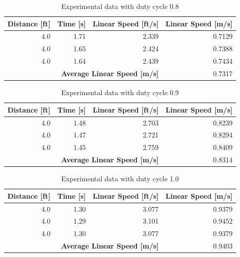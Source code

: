 \documentclass[fontsize=11pt, %
                             paper=letter, %
                             openany, %
                             captions=tableheading,
                             index=totoc,
                             hyperref]{labbook}
\begin{document}
\begin{addmargin}[0cm]{0cm}
\begin{table}[h!]
    \centering
    \begin{tabular}{r|r|r|r}
        \toprule
        \textbf{Distance [ft]} & \textbf{Time [s]} & \textbf{Linear Speed [ft/s]} & \textbf{Linear Speed [m/s]}\\
        \toprule
        4.0 & 1.71 & 2.339 & 0.7129\\
        4.0 & 1.65 & 2.424 & 0.7388\\
        4.0 & 1.64 & 2.439 & 0.7434\\
        \bottomrule
        \multicolumn{3}{r|}{\textbf{Average Linear Speed [m/s]}} & 0.7317\\
        \bottomrule
    \end{tabular}
    \caption{Experimental data with duty cycle 0.8}
    \label{tab:duty0.8}
\end{table}

\begin{table}[h!]
    \centering
    \begin{tabular}{r|r|r|r}
        \toprule
        \textbf{Distance [ft]} & \textbf{Time [s]} & \textbf{Linear Speed [ft/s]} & \textbf{Linear Speed [m/s]}\\
        \toprule
        4.0 & 1.48 & 2.703 & 0.8239\\
        4.0 & 1.47 & 2.721 & 0.8294\\
        4.0 & 1.45 & 2.759 & 0.8409\\
        \bottomrule
        \multicolumn{3}{r|}{\textbf{Average Linear Speed [m/s]}} & 0.8314\\
        \bottomrule
    \end{tabular}
    \caption{Experimental data with duty cycle 0.9}
    \label{tab:duty0.9}
\end{table}

\begin{table}[h!]
    \centering
    \begin{tabular}{r|r|r|r}
        \toprule
        \textbf{Distance [ft]} & \textbf{Time [s]} & \textbf{Linear Speed [ft/s]} & \textbf{Linear Speed [m/s]}\\
        \toprule
        4.0 & 1.30 & 3.077 & 0.9379\\
        4.0 & 1.29 & 3.101 & 0.9452\\
        4.0 & 1.30 & 3.077 & 0.9379\\
        \bottomrule
        \multicolumn{3}{r|}{\textbf{Average Linear Speed [m/s]}} & 0.9403\\
        \bottomrule
    \end{tabular}
    \caption{Experimental data with duty cycle 1.0}
    \label{tab:duty1.0}
\end{table}


\end{addmargin}
\end{document}
